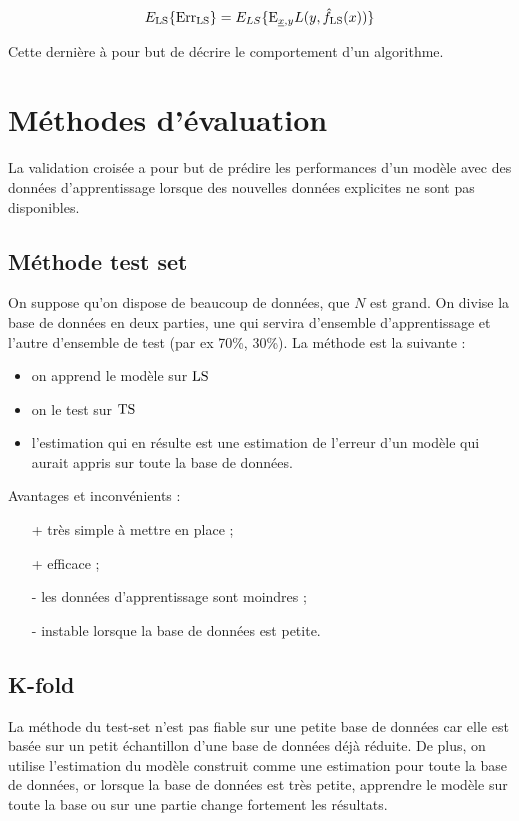 	$$E_{\text{LS}} \lbrace \text{Err}_{\text{LS}} \rbrace = E_{LS}\{\text{E}_{\underline{x}, y}{L(y, \hat{f}_{\text{LS}}(x))}\}$$
	
	Cette dernière à pour but de décrire le comportement d'un algorithme.

\section{Méthodes d'évaluation}

	La validation croisée a pour but de prédire les performances d'un modèle avec des données d'apprentissage lorsque des nouvelles données explicites ne sont pas disponibles.
	
	\subsection{Méthode test set}

	On suppose qu'on dispose de beaucoup de données, que $N$ est grand. On divise la base de données en deux parties, une qui servira d'ensemble d'apprentissage et l'autre d'ensemble de test (par ex 70\%, 30\%). La méthode est la suivante :

	\begin{itemize}
		\item on apprend le modèle sur $\text{LS}$
		\item on le test sur $\text{TS}$
		\item l'estimation qui en résulte est une estimation de l'erreur d'un modèle qui aurait appris sur toute la base de données.
	\end{itemize}
	
	Avantages et inconvénients :
	
	\begin{itemize}
		\item[+] très simple à mettre en place ;
		\item[+] efficace ;
		\item[-] les données d'apprentissage sont moindres ;
		\item[-] instable lorsque la base de données est petite.
	\end{itemize}
	
	
	\subsection{K-fold}
	
	La méthode du test-set n'est pas fiable sur une petite base de données car elle est basée sur un petit échantillon d'une base de données déjà réduite. De plus, on utilise l'estimation du modèle construit comme une estimation pour toute la base de données, or lorsque la base de données est très petite, apprendre le modèle sur toute la base ou sur une partie change fortement les résultats.
	
